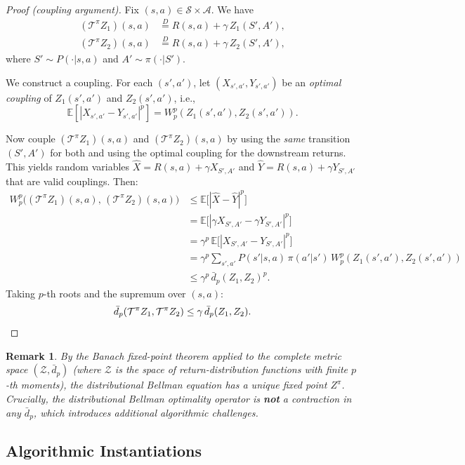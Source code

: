 \documentclass[11pt,a4paper]{article}
\newtheorem{remark}[theorem]{Remark}
\newcommand{\E}{\mathbb{E}}
\newcommand{\cS}{\mathcal{S}}
\newcommand{\cA}{\mathcal{A}}
\newcommand{\cZ}{\mathcal{Z}}
\newcommand{\cT}{\mathcal{T}}
\begin{document}
\begin{proof}[Proof (coupling argument)]
Fix $(s, a) \in \cS \times \cA$. We have
\begin{align*}
  (\cT^\pi Z_1)(s,a) &\stackrel{D}{=} R(s,a) + \gamma\, Z_1(S', A'), \\
  (\cT^\pi Z_2)(s,a) &\stackrel{D}{=} R(s,a) + \gamma\, Z_2(S', A'),
\end{align*}
where $S' \sim P(\cdot|s,a)$ and $A' \sim \pi(\cdot|S')$.

We construct a coupling. For each $(s', a')$, let $(X_{s',a'}, Y_{s',a'})$ be an
\emph{optimal coupling} of $Z_1(s', a')$ and $Z_2(s', a')$, i.e.,
\[
  \E[|X_{s',a'} - Y_{s',a'}|^p] = W_p^p(Z_1(s',a'), Z_2(s',a')).
\]

Now couple $(\cT^\pi Z_1)(s,a)$ and $(\cT^\pi Z_2)(s,a)$ by using the \emph{same}
transition $(S', A')$ for both and using the optimal coupling for the downstream
returns. This yields random variables $\hat{X} = R(s,a) + \gamma X_{S',A'}$ and
$\hat{Y} = R(s,a) + \gamma Y_{S',A'}$ that are valid couplings.  Then:
\begin{align*}
  W_p^p\bigl((\cT^\pi Z_1)(s,a),\, (\cT^\pi Z_2)(s,a)\bigr)
  &\leq \E\bigl[|\hat{X} - \hat{Y}|^p\bigr] \\
  &= \E\bigl[|\gamma X_{S',A'} - \gamma Y_{S',A'}|^p\bigr] \\
  &= \gamma^p \,\E\bigl[|X_{S',A'} - Y_{S',A'}|^p\bigr] \\
  &= \gamma^p \sum_{s',a'} P(s'|s,a)\,\pi(a'|s')\, W_p^p(Z_1(s',a'), Z_2(s',a')) \\
  &\leq \gamma^p \,\bar{d}_p(Z_1, Z_2)^p.
\end{align*}
Taking $p$-th roots and the supremum over $(s, a)$:
\[
  \bar{d}_p(\cT^\pi Z_1, \cT^\pi Z_2) \leq \gamma\, \bar{d}_p(Z_1, Z_2). \qedhere
\]
\end{proof}

\begin{remark}
By the Banach fixed-point theorem applied to the complete metric space
$(\cZ, \bar{d}_p)$ (where $\cZ$ is the space of return-distribution functions with
finite $p$-th moments), the distributional Bellman equation has a unique
fixed point $Z^\pi$.  Crucially, the distributional Bellman \emph{optimality}
operator is \textbf{not} a contraction in any $\bar{d}_p$, which introduces
additional algorithmic challenges.
\end{remark}

\subsection{Algorithmic Instantiations}
\end{document}
